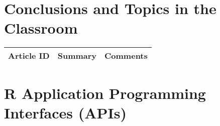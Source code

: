\section{Conclusions and Topics in the Classroom}

\begin{table}[H]\centering
	\begin{tabular}{p{1cm}p{4cm}p{3cm}}
		Article ID & Summary & Comments\\
		\hline
		\hline
	\end{tabular}
\end{table}


\section{R Application Programming Interfaces (APIs)}

